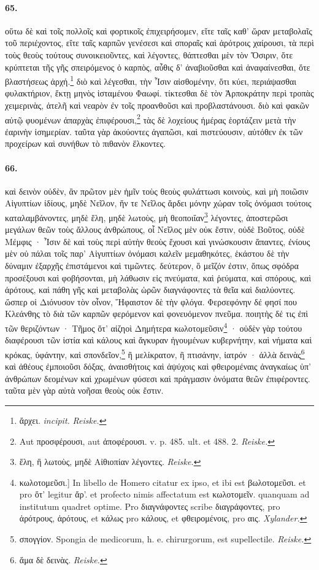 \documentclass[a4paper, 11pt, oneside, polutonikogreek, german]{article}
\begin{document}
\paragraph{65.}
οὕτω δὲ καὶ τοῖς πολλοῖς καὶ φορτικοῖς ἐπιχειρήσομεν, εἴτε ταῖς καθ' ὥραν μεταβολαῖς τοῦ περιέχοντος, εἴτε ταῖς καρπῶν γενέσεσι καὶ σποραῖς καὶ ἀρότροις χαίρουσι, τὰ περὶ τοὺς θεοὺς τούτους συνοικειοῦντες, καὶ λέγοντες, θάπτεσθαι μὲν τὸν Ὄσιριν, ὅτε κρύπτεται τῆς γῆς σπειρόμενος ὁ καρπὸς, αὖθις δ' ἀναβιοῦσθαι καὶ ἀναφαίνεσθαι, ὅτε βλαστήσεως ἀρχή.\footnote{ἄρχει. \emph{incipit.} \emph{Reiske.}} διὸ καὶ λέγεσθαι, τὴν Ἶσιν αἰσθομένην, ὅτι κύει, περιάψασθαι φυλακτήριον, ἕκτῃ μηνὸς ἱσταμένου Φαωφί. τίκτεσθαι δὲ τὸν Ἁρποκράτην περὶ τροπὰς χειμερινὰς, ἀτελῆ καὶ νεαρὸν ἐν τοῖς προανθοῦσι καὶ προβλαστάνουσι. διὸ καὶ φακῶν αὐτῷ φυομένων ἀπαρχὰς ἐπιφέρουσι,\footnote{Aut προσφέρουσι, aut ἀποφέρουσι. v. p. 485. ult. et 488. 2. \emph{Reiske.}} τὰς δὲ λοχείους ἡμέρας ἑορτάζειν μετὰ τὴν ἐαρινὴν ἰσημερίαν. ταῦτα γὰρ ἀκούοντες ἀγαπῶσι, καὶ πιστεύουσιν, αὐτόθεν ἐκ τῶν προχείρων καὶ συνήθων τὸ πιθανὸν ἕλκοντες.

\paragraph{66.}
καὶ δεινὸν οὐδὲν, ἂν πρῶτον μὲν ἡμῖν τοὺς θεοὺς φυλάττωσι κοινοὺς, καὶ μὴ ποιῶσιν Αἰγυπτίων ἰδίους, μηδὲ Νεῖλον, ἥν τε Νεῖλος ἄρδει μόνην χώραν τοῖς ὀνόμασι τούτοις καταλαμβάνοντες, μηδὲ ἕλη, μηδὲ λωτοὺς, μὴ θεοποιΐαν\footnote{ἕλη, ἢ λωτοὺς, μηδὲ Αἰθιοπίαν λέγοντες. \emph{Reiske.}} λέγοντες, ἀποστερῶσι μεγάλων θεῶν τοὺς ἄλλους ἀνθρώπους, οἷ Νεῖλος μὲν οὐκ ἔστιν, οὐδὲ Βοῦτος, οὐδὲ Μέμφις · Ἶσιν δὲ καὶ τοὺς περὶ αὐτὴν θεοὺς ἔχουσι καὶ γινώσκουσιν ἅπαντες, ἐνίους μὲν οὐ πάλαι τοῖς παρ' Αἰγυπτίων ὀνόμασι καλεῖν μεμαθηκότες, ἑκάστου δὲ τὴν δύναμιν ἐξαρχῆς ἐπιστάμενοι καὶ τιμῶντες. δεύτερον, ὃ μεῖζόν ἐστιν, ὅπως σφόδρα προσέξουσι καὶ φοβήσονται, μὴ λάθωσιν εἰς πνεύματα, καὶ ῥεύματα, καὶ σπόρους, καὶ ἀρότους, καὶ πάθη γῆς καὶ μεταβολὰς ὡρῶν διαγνάφοντες τὰ θεῖα καὶ διαλύοντες. ὥσπερ οἱ Διόνυσον τὸν οἶνον, Ἥφαιστον δὲ τὴν φλόγα. Φερσεφόνην δέ φησί που Κλεάνθης τὸ διὰ τῶν καρπῶν φερόμενον καὶ φονευόμενον πνεῦμα. ποιητὴς δέ τις ἐπὶ τῶν θεριζόντων · Τῆμος ὅτ' αἰζηοὶ Δημήτερα κωλοτομεῦσιν\footnote{κωλοτομεῦσι.] In libello de Homero citatur ex ipso, et ibi est βωλοτομεῦσι. et pro ὅτ' legitur ἄρ'. et profecto nimis affectatum est κωλοτομεῖν. quanquam ad institutum quadret optime. Pro διαγνάφοντες scribe διαγράφοντες, pro ἀρότρους, ἀρότους, et κάλως pro κάλους, et φθειρομένοις, pro αις. \emph{Xylander.} } · οὐδὲν γὰρ τούτου διαφέρουσι τῶν ἱστία καὶ κάλους καὶ ἄγκυραν ἡγουμένων κυβερνήτην, καὶ νήματα καὶ κρόκας, ὑφάντην, καὶ σπονδεῖον,\footnote{σπογγίον. Spongia de medicorum, h. e. chirurgorum, est supellectile. \emph{Reiske.}} ἢ μελίκρατον, ἢ πτισάνην, ἰατρόν · ἀλλὰ δεινὰς\footnote{ἅμα δὲ δεινὰς. \emph{Reiske.}} καὶ ἀθέους ἐμποιοῦσι δόξας, ἀναισθήτοις καὶ ἀψύχοις καὶ φθειρομέναις ἀναγκαίως ὑπ' ἀνθρώπων δεομένων καὶ χρωμένων φύσεσι καὶ πράγμασιν ὀνόματα θεῶν ἐπιφέροντες. ταῦτα μὲν γὰρ αὐτὰ νοῆσαι θεοὺς οὐκ ἔστιν.
\end{document}

